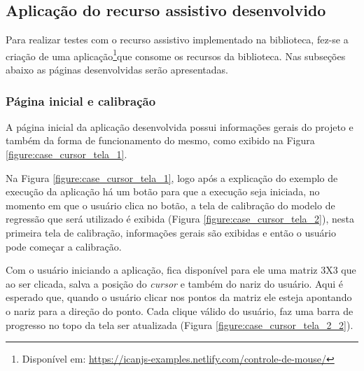 \subsection{Aplicação do recurso assistivo desenvolvido}

\par Para realizar testes com o recurso assistivo implementado na biblioteca, fez-se a criação de uma aplicação\footnote{Disponível em: \url{https://icanjs-examples.netlify.com/controle-de-mouse/}}que consome os recursos da biblioteca. Nas subseções abaixo as páginas desenvolvidas serão apresentadas.

\subsubsection{Página inicial e calibração}

\par A página inicial da aplicação desenvolvida possui informações gerais do projeto e também da forma de funcionamento do mesmo, como exibido na Figura \ref{figure:case_cursor_tela_1}.


\par Na Figura \ref{figure:case_cursor_tela_1}, logo após a explicação do exemplo de execução da aplicação há um botão para que a execução seja iniciada, no momento em que o usuário clica no botão, a tela de calibração do modelo de regressão que será utilizado é exibida (Figura \ref{figure:case_cursor_tela_2}), nesta primeira tela de calibração, informações gerais são exibidas e então o usuário pode começar a calibração.


\par Com o usuário iniciando a aplicação, fica disponível para ele uma matriz 3X3 que ao ser clicada, salva a posição do \textit{cursor} e também do nariz do usuário. Aqui é esperado que, quando o usuário clicar nos pontos da matriz ele esteja apontando o nariz para a direção do ponto. Cada clique válido do usuário, faz uma barra de progresso no topo da tela ser atualizada (Figura \ref{figure:case_cursor_tela_2_2}).


